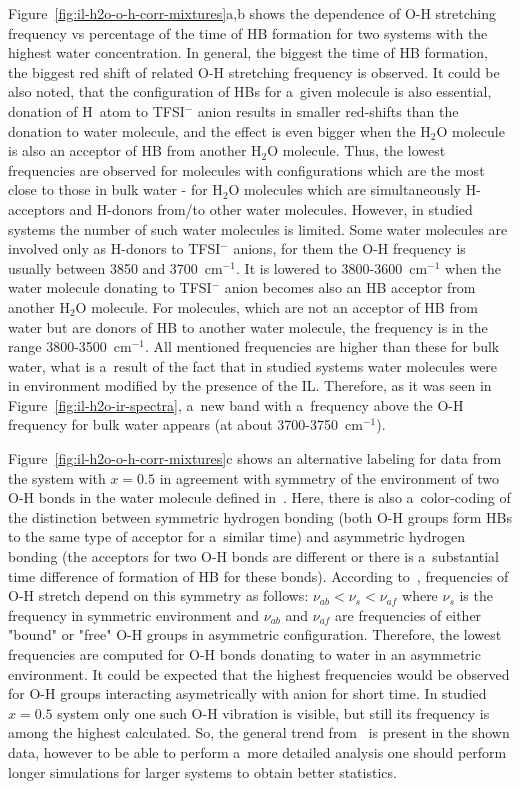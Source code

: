 Figure~\ref{fig:il-h2o-o-h-corr-mixtures}a,b shows the dependence of O-H stretching frequency vs percentage of the time of HB formation for two systems with the highest water concentration. In general, the biggest the time of HB formation, the biggest red shift of related O-H stretching frequency is observed. It could be also noted, that the configuration of HBs for a~given molecule is also essential, donation of H~atom to TFSI$^{-}$ anion results in smaller red-shifts than the donation to water molecule, and the effect is even bigger when the H$_2$O molecule is also an acceptor of HB from another H$_2$O molecule. Thus, the lowest frequencies are observed for molecules with configurations which are the most close to those in bulk water - for H$_2$O molecules which are simultaneously H-acceptors and H-donors from/to other water molecules. However, in studied systems the number of such water molecules is limited. Some water molecules are involved only as H-donors to TFSI$^{-}$ anions, for them the O-H frequency is usually between 3850 and 3700~cm$^{-1}$. It is lowered to 3800-3600~cm$^{-1}$ when the water molecule donating to TFSI$^{-}$ anion becomes also an HB acceptor from another H$_2$O molecule. For molecules, which are not an acceptor of HB from water but are donors of HB to another water molecule, the frequency is in the range 3800-3500~cm$^{-1}$. All mentioned frequencies are higher than these for bulk water, what is a~result of the fact that in studied systems water molecules were in environment modified by the presence of the IL. Therefore, as it was seen in Figure~\ref{fig:il-h2o-ir-spectra}, a~new band with a~frequency above the O-H frequency for bulk water appears (at about 3700-3750~cm$^{-1}$).

Figure~\ref{fig:il-h2o-o-h-corr-mixtures}c shows an alternative labeling for data from the system with $x = 0.5$ in agreement with symmetry of the environment of two O-H bonds in the water molecule defined in~\cite{experimental-ir-emim-bf4-h2o}. Here, there is also a~color-coding of the distinction between symmetric hydrogen bonding (both O-H groups form HBs to the same type of acceptor for a~similar time) and asymmetric hydrogen bonding (the acceptors for two O-H bonds are different or there is a~substantial time difference of formation of HB for these bonds). According to~\cite{experimental-ir-emim-bf4-h2o}, frequencies of O-H stretch depend on this symmetry as follows: $\nu_{ab} < \nu_s < \nu_{af}$ where $\nu_s$ is the frequency in symmetric environment and $\nu_{ab}$ and $\nu_{af}$ are frequencies of either "bound" or "free" O-H groups in asymmetric configuration. Therefore, the lowest frequencies are computed for O-H bonds donating to water in an asymmetric environment. It could be expected that the highest frequencies would be observed for O-H groups interacting asymetrically with anion for short time. In studied $x = 0.5$ system only one such O-H vibration is visible, but still its frequency is among the highest calculated. So, the general trend from~\cite{experimental-ir-emim-bf4-h2o} is present in the shown data, however to be able to perform a~more detailed analysis one should perform longer simulations for larger systems to obtain better statistics.

\cleardoublepage